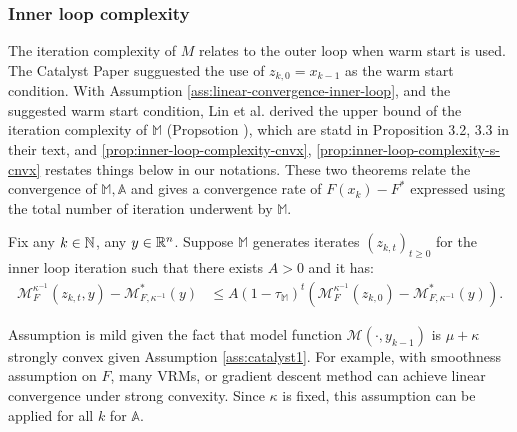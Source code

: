 \documentclass[12pt]{article}
\begin{document}
        \subsubsection{Inner loop complexity}
            The iteration complexity of $M$ relates to the outer loop when warm start is used. 
            The Catalyst Paper \cite{lin_universal_2015} sugguested the use of $z_{k, 0} = x_{k - 1}$ as the warm start condition. 
            With Assumption \ref{ass:linear-convergence-inner-loop}, and the suggested warm start condition,  Lin et al. derived the upper bound of the iteration complexity of $\mathbb M$ (Propsotion ), which are statd in Proposition 3.2, 3.3 in their text, and \ref{prop:inner-loop-complexity-cnvx}, \ref{prop:inner-loop-complexity-s-cnvx} restates things below in our notations. 
            These two theorems relate the convergence of $\mathbb M, \mathbb A$ and gives a convergence rate of $F(x_k) - F^*$ expressed using the total number of iteration underwent by $\mathbb M$. 
            \begin{assumption}\label{ass:linear-convergence-inner-loop}
                Fix any $k \in \mathbb N$, any $y \in \mathbb R^n$. 
                Suppose $\mathbb M$ generates iterates $(z_{k, t})_{t \ge 0}$ for the inner loop iteration such that there exists $A > 0$ and it has: 
                \begin{align*}
                    \mathcal M_F^{\kappa^{-1}}(z_{k, t}, y) - \mathcal M^*_{F, \kappa^{-1}}(y) 
                    &\le 
                    A(1 - \tau_{\mathbb M})^t
                    \left(
                        \mathcal M_{F}^{\kappa^{-1}}(z_{k,0})
                        -
                        \mathcal M^*_{F, \kappa^{-1}}(y)
                    \right). 
                \end{align*}
            \end{assumption}
            \begin{remark}
                Assumption is mild given the fact that model function $\mathcal M(\cdot, y_{k - 1})$ is $\mu + \kappa$ strongly convex given Assumption \ref{ass:catalyst1}.
                For example, with smoothness assumption on $F$, many VRMs, or gradient descent method can achieve linear convergence under strong convexity. 
                Since $\kappa$ is fixed, this assumption can be applied for all $k$ for $\mathbb A$. 
            \end{remark}
\end{document}
